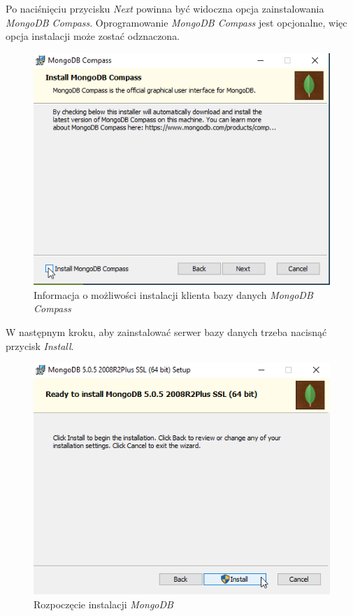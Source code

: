 \documentclass[a4paper,twoside,12pt]{book}
\begin{document}
Po naciśnięciu przycisku \textit{Next} powinna być widoczna opcja zainstalowania \textit{MongoDB Compass}. Oprogramowanie \textit{MongoDB Compass} jest opcjonalne, więc opcja instalacji może zostać odznaczona.
\begin{figure}[h!]
	\centering
	\includegraphics[width=0.6\linewidth]{../zrzuty_ekranu/instalcja_mongodb/mogndodb5}
	\caption{Informacja o możliwości instalacji klienta bazy danych \textit{MongoDB Compass}}
	\label{fig:mogndodb5}
\end{figure}
\FloatBarrier

\newpage
W następnym kroku, aby zainstalować serwer bazy danych trzeba nacisnąć przycisk \textit{Install}.
\begin{figure}[h!]
	\centering
	\includegraphics[width=0.6\linewidth]{../zrzuty_ekranu/instalcja_mongodb/mongodb6}
	\caption{Rozpoczęcie instalacji \textit{MongoDB}}
	\label{fig:mongodb6}
\end{figure}
\FloatBarrier
\end{document}
